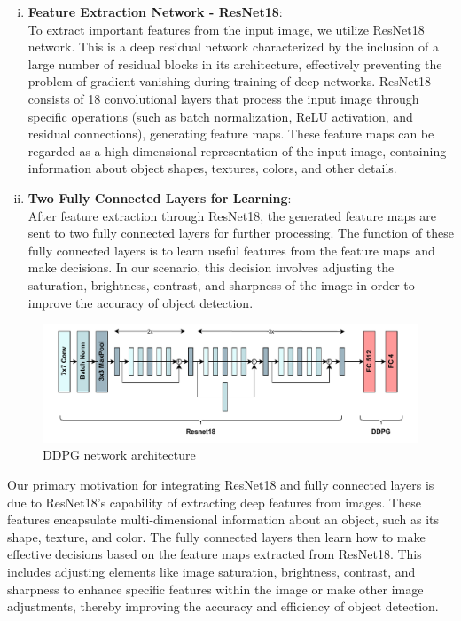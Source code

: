 \documentclass{PHlab-thesis}
\begin{document}
\begin{enumerate}[(i)]
\item \textbf{Feature Extraction Network - ResNet18}: \\
To extract important features from the input image, we utilize ResNet18 network. This is a deep residual network characterized by the inclusion of a large number of residual blocks in its architecture, effectively preventing the problem of gradient vanishing during training of deep networks. ResNet18 consists of 18 convolutional layers that process the input image through specific operations (such as batch normalization, ReLU activation, and residual connections), generating feature maps. These feature maps can be regarded as a high-dimensional representation of the input image, containing information about object shapes, textures, colors, and other details.

\item \textbf{Two Fully Connected Layers for Learning}: \\
After feature extraction through ResNet18, the generated feature maps are sent to two fully connected layers for further processing. The function of these fully connected layers is to learn useful features from the feature maps and make decisions. In our scenario, this decision involves adjusting the saturation, brightness, contrast, and sharpness of the image in order to improve the accuracy of object detection.
\end{enumerate}

\begin{figure}[H] 
    \centering 
    \includegraphics[width=\textwidth]{images/DDPG network architecture.pdf} 
    \caption{DDPG network architecture} 
    \label{Fig.DDPG network architecture} 
\end{figure}

Our primary motivation for integrating ResNet18 and fully connected layers is due to ResNet18's capability of extracting deep features from images. These features encapsulate multi-dimensional information about an object, such as its shape, texture, and color. The fully connected layers then learn how to make effective decisions based on the feature maps extracted from ResNet18. This includes adjusting elements like image saturation, brightness, contrast, and sharpness to enhance specific features within the image or make other image adjustments, thereby improving the accuracy and efficiency of object detection.
\end{document}
